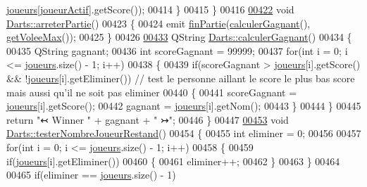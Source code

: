 \begin{DoxyCode}
      \hyperlink{class_darts_a81bc116f3ae70cea1f492f87f01901c7}{joueurs}[\hyperlink{class_darts_a68fb01b9aad6502e4429dfbf2a72d50b}{joueurActif}].getScore());
00414     \}
00415 \}
00416 
\hyperlink{class_darts_aa9685f754172d995cdd04d39d9651227}{00422} \textcolor{keywordtype}{void} \hyperlink{class_darts_aa9685f754172d995cdd04d39d9651227}{Darts::arreterPartie}()
00423 \{
00424     emit \hyperlink{class_darts_a751870924fe01a94fbf49ce45451a218}{finPartie}(\hyperlink{class_darts_a4d7196c95f584cdce4a33d52f934121f}{calculerGagnant}(), \hyperlink{class_darts_af2ca14bafbcdabe87fc306cc2e1d390e}{getVoleeMax}());
00425 \}
00426 
\hyperlink{class_darts_a4d7196c95f584cdce4a33d52f934121f}{00433} QString \hyperlink{class_darts_a4d7196c95f584cdce4a33d52f934121f}{Darts::calculerGagnant}()
00434 \{
00435     QString gagnant;
00436     \textcolor{keywordtype}{int} scoreGagnant = 99999;
00437     \textcolor{keywordflow}{for}(\textcolor{keywordtype}{int} i = 0; i <= \hyperlink{class_darts_a81bc116f3ae70cea1f492f87f01901c7}{joueurs}.size() - 1; i++)
00438     \{
00439         \textcolor{keywordflow}{if}(scoreGagnant > \hyperlink{class_darts_a81bc116f3ae70cea1f492f87f01901c7}{joueurs}[i].getScore() && !\hyperlink{class_darts_a81bc116f3ae70cea1f492f87f01901c7}{joueurs}[i].getEliminer()) \textcolor{comment}{// test le
       personne aillant le score le plus bas score mais aussi qu'il ne soit pas eliminer}
00440         \{
00441             scoreGagnant = \hyperlink{class_darts_a81bc116f3ae70cea1f492f87f01901c7}{joueurs}[i].getScore();
00442             gagnant = \hyperlink{class_darts_a81bc116f3ae70cea1f492f87f01901c7}{joueurs}[i].getNom();
00443         \}
00444     \}
00445     \textcolor{keywordflow}{return} \textcolor{stringliteral}{"↢  Winner "} + gagnant + \textcolor{stringliteral}{"  ↣"};
00446 \}
00447 
\hyperlink{class_darts_a0fbfcd2202600e886177e2202a44b3bd}{00453} \textcolor{keywordtype}{void} \hyperlink{class_darts_a0fbfcd2202600e886177e2202a44b3bd}{Darts::testerNombreJoueurRestand}()
00454 \{
00455     \textcolor{keywordtype}{int} eliminer = 0;
00456 
00457     \textcolor{keywordflow}{for}(\textcolor{keywordtype}{int} i = 0; i <= \hyperlink{class_darts_a81bc116f3ae70cea1f492f87f01901c7}{joueurs}.size() - 1; i++)
00458     \{
00459         \textcolor{keywordflow}{if}(\hyperlink{class_darts_a81bc116f3ae70cea1f492f87f01901c7}{joueurs}[i].getEliminer())
00460         \{
00461             eliminer++;
00462         \}
00463     \}
00464 
00465     \textcolor{keywordflow}{if}(eliminer == \hyperlink{class_darts_a81bc116f3ae70cea1f492f87f01901c7}{joueurs}.size() - 1)

\end{DoxyCode}
